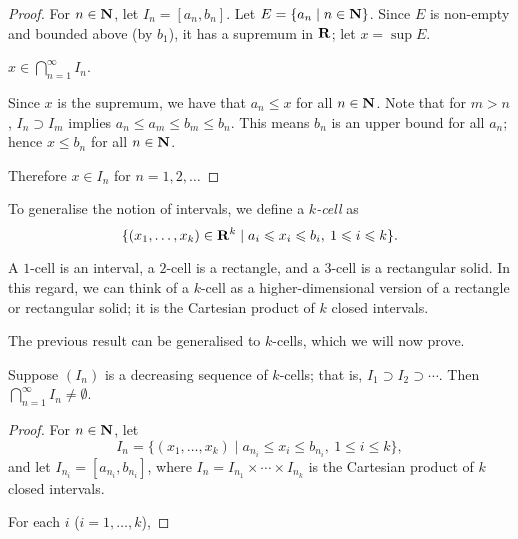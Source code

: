 \begin{figure}[H]
\centering
{}
\end{figure}

\begin{proof}
For $n\in\mathbf N$, let $I_n=[a_n,b_n]$. Let $E=\{a_n\mid n\in\mathbf N\}$. Since $E$ is non-empty and bounded above (by $b_1$), it has a supremum in $\mathbf R$; let $x=\sup E$.
\begin{claim}
$\displaystyle x\in\bigcap_{n=1}^{\infty}I_n$.
\end{claim}
Since $x$ is the supremum, we have that $a_n\le x$ for all $n\in\mathbf N$. Note that for $m>n$, $I_n\supset I_m$ implies $a_n\le a_m\le b_m\le b_n$. This means $b_n$ is an upper bound for all $a_n$; hence $x\le b_n$ for all $n\in\mathbf N$.

Therefore $x\in I_n$ for $n=1,2,\dots$
\end{proof}

To generalise the notion of intervals, we define a \emph{$k$-cell} as
\[\{(x_1,\dots,x_k)\in\mathbf R^k\mid a_i\leqslant x_i\leqslant b_i,\:1\leqslant i\leqslant k\}.\]

\begin{example}
A $1$-cell is an interval, a $2$-cell is a rectangle, and a $3$-cell is a rectangular solid. In this regard, we can think of a $k$-cell as a higher-dimensional version of a rectangle or rectangular solid; it is the Cartesian product of $k$ closed intervals.
\end{example}

The previous result can be generalised to $k$-cells, which we will now prove.

\begin{proposition}
Suppose $(I_n)$ is a decreasing sequence of $k$-cells; that is, $I_1\supset I_2\supset\cdots$. Then $\bigcap_{n=1}^{\infty}I_n\neq\emptyset$.
\end{proposition}

\begin{proof}
For $n\in\mathbf N$, let
\[I_n=\{(x_1,\dots,x_k)\mid a_{n_i}\le x_i\le b_{n_i},\:1\le i\le k\},\]
and let $I_{n_i}=[a_{n_i},b_{n_i}]$, where $I_n=I_{n_1}\times\cdots\times I_{n_k}$ is the Cartesian product of $k$ closed intervals.

For each $i$ ($i=1,\dots,k$), 
\end{proof}

